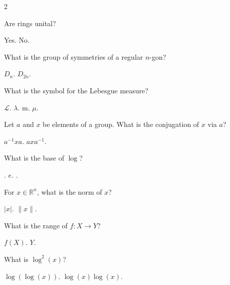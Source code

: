 \documentclass[a4paper,12pt]{exam}
\begin{document}
\begin{multicols}{2}
\begin{questions}
\begin{samepage}
    \question Are rings unital?
        \begin{checkboxes}
            \choice Yes.
            \choice No.
        \end{checkboxes}
  \end{samepage}
\begin{samepage}
    \question What is the group of symmetries of a regular $n$-gon?
        \begin{checkboxes}
            \choice $D_n$.
            \choice $D_{2n}$.
        \end{checkboxes}
\end{samepage}
    \question What is the symbol for the Lebesgue measure? 
        \begin{checkboxes}
            \choice $\mathcal{L}$.
            \choice $\lambda$.
            \choice m.
            \choice $\mu$.
        \end{checkboxes}

    \question Let $a$ and $x$ be elements of a group. What is the conjugation of $x$ via $a$?
        \begin{checkboxes}
            \choice $a^{-1}xa$.
            \choice $axa^{-1}$.
        \end{checkboxes}

    \question What is the base of $\log$? 
        \begin{checkboxes}
            .
            \choice $e$.
            .
        \end{checkboxes}

    \question For $x\in \mathbb{R}^n$, what is the norm of $x$? 
        \begin{checkboxes}
            \choice $|x|$.
            \choice $\|x\|$.
        \end{checkboxes}

    \question What is the range of $f:X\to Y$? 
        \begin{checkboxes}
            \choice $f(X)$.
            \choice $Y$. 
        \end{checkboxes}

    \question What is $\log^2(x)$? 
        \begin{checkboxes}
            \choice $\log(\log(x))$.
            \choice $\log(x)\log(x)$.
        \end{checkboxes}


\end{questions}
\end{multicols}
\end{document}
